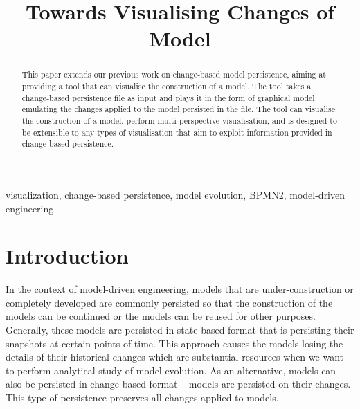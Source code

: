 \documentclass[conference]{IEEEtran}
\begin{document}
\title{Towards Visualising Changes of Model
}

\author{
}
\maketitle

\begin{abstract}
This paper extends our previous work on change-based model persistence, aiming at
providing a tool that can visualise the construction of a model. The tool 
takes a change-based persistence file as input and plays it 
in the form of graphical model emulating the changes applied to 
the model persisted in the file. 
The tool can visualise the construction of a model, 
perform multi-perspective visualisation, and
is designed to be extensible to any types of visualisation 
that aim to exploit information provided in change-based persistence.


\end{abstract}

\begin{IEEEkeywords}
visualization, change-based persistence, model evolution, BPMN2, model-driven engineering
\end{IEEEkeywords}

\section{Introduction}
\label{sec:introduction}
In the context of model-driven engineering, models that are under-construction or completely developed are commonly persisted 
so that the construction of the models can be continued or the models can be reused for other purposes. 
Generally, these models are persisted in state-based format that is persisting their snapshots at certain points of time. 
This approach causes the models losing the details of their historical changes which are substantial resources when 
we want to perform analytical study of model evolution. As an alternative, models can also be persisted in change-based format -- models are 
persisted on their changes. This type of persistence preserves all changes applied to models.
\end{document}
